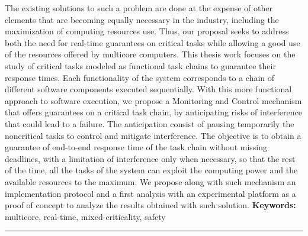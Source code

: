 \documentclass[french, a4paper, 11pt, twoside, pdftex]{StyleThese}
\begin{document}
\begin{vcenterpage}
{		The existing solutions to such a problem are done at the expense of other elements that are becoming equally necessary in the industry, including the maximization of computing resources use. Thus, our proposal seeks to address both the need for real-time guarantees on critical tasks while allowing a good use of the resources offered by multicore computers. This thesis work focuses on the study of critical tasks modeled as functional task chains to guarantee their response times. Each functionality of the system corresponds to a chain of different software components executed sequentially. With this more functional approach to software execution, we propose a Monitoring and Control mechanism that offers guarantees on a critical task chain, by anticipating risks of interference that could lead to a failure. The anticipation consist of pausing temporarily the noncritical tasks to control and mitigate interference. The objective is to obtain a guarantee of end-to-end response time of the task chain without missing deadlines, with a limitation of interference only when necessary, so that the rest of the time, all the tasks of the system can exploit the computing power and the available resources to the maximum. 
		We propose along with such mechanism an implementation protocol and a first analysis with an experimental platform as a proof of concept to analyze the results obtained with such solution.
	}
	\smallbreak
	{\large\textbf{Keywords:} multicore, real-time, mixed-criticality, safety}
\\ %
\noindent\rule[2pt]{\textwidth}{0.5pt}
\end{vcenterpage}

\restoregeometry
\end{document}
